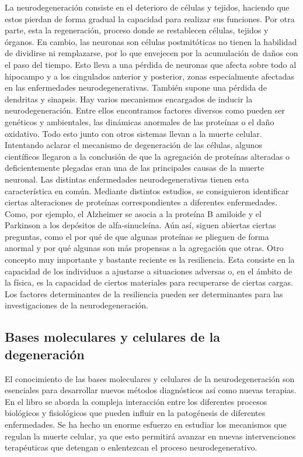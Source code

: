 \documentclass[12pt]{article}
\begin{document}
	La neurodegeneración consiste en el deterioro de células y tejidos, haciendo que estos pierdan de forma gradual la capacidad para realizar sus funciones. Por otra parte, esta la regeneración, proceso donde se restablecen células, tejidos y órganos. En cambio, las neuronas son células postmitóticas no tienen la habilidad de dividirse ni remplazarse, por lo que envejecen por la acumulación de daños con el paso del tiempo. Esto lleva a una pérdida de neuronas que afecta sobre todo al hipocampo y a los cingulados anterior y posterior, zonas especialmente afectadas en las enfermedades neurodegenerativas. También supone una pérdida de dendritas y sinapsis. 
	Hay varios mecanismos encargados de inducir la neurodegeneración. Entre ellos encontramos factores diversos como pueden ser genéticos y ambientales, las dinámicas anormales de las proteínas o el daño oxidativo.   Todo esto junto con otros sistemas llevan a la muerte celular.\\
	
	Intentando aclarar el mecanismo de degeneración de las células, algunos científicos llegaron a la conclusión de que la agregación de proteínas alteradas o deficientemente plegadas eran una de las principales causas de la muerte neuronal. Las distintas enfermedades neurodegenerativas tienen esta característica en común. Mediante distintos estudios, se consiguieron identificar ciertas alteraciones de proteínas correspondientes a diferentes enfermedades. Como, por ejemplo, el Alzheimer se asocia a la proteína B amiloide y el Parkinson a los depósitos de alfa-sinucleína.  Aún así, siguen abiertas ciertas preguntas, como el por qué de que algunas proteínas se plieguen de forma anormal y por qué algunas son más propensas a la agregación que otras.
	Otro concepto muy importante y bastante reciente es la resiliencia. Esta consiste en la capacidad de los individuos a ajustarse a situaciones adversas o, en el ámbito de la física, es la capacidad de ciertos materiales para recuperarse de ciertas cargas. Los factores determinantes de la resiliencia pueden ser determinantes para las investigaciones de la neurodegeneración.

	\subsection{Bases moleculares y celulares de la degeneración}
	
	El conocimiento de las bases moleculares y celulares de la neurodegeneración son esenciales para desarrollar nuevos métodos diagnósticos así como nuevas terapias. En el libro se aborda la compleja interacción entre los diferentes procesos biológicos y fisiológicos que pueden influir en la patogénesis de diferentes enfermedades. Se ha hecho un enorme esfuerzo en estudiar los mecanismos que regulan la muerte celular, ya que esto permitirá avanzar en nuevas intervenciones terapéuticas que detengan o enlentezcan el proceso neurodegenerativo.\\
	
\end{document}
